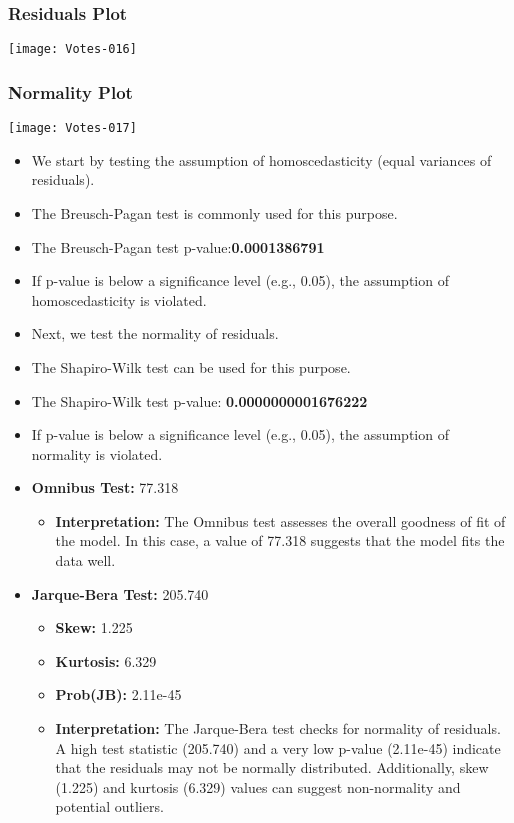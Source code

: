\documentclass[fleqn,a4paper,12pt]{article}
\begin{document}
\subsubsection{Residuals Plot}
\texttt{[image: Votes-016]}

 \subsubsection{Normality Plot}
\texttt{[image: Votes-017]}

 
\begin{itemize}
\item We start by testing the assumption of homoscedasticity (equal variances of residuals).
\item The Breusch-Pagan test is commonly used for this purpose.
\item The Breusch-Pagan test p-value:\textbf{0.0001386791}
\item If p-value is below a significance level (e.g., 0.05), the assumption of homoscedasticity is violated.
\end{itemize}
 
 
\begin{itemize}
\item Next, we test the normality of residuals.
\item The Shapiro-Wilk test can be used for this purpose.
\item The Shapiro-Wilk test p-value: \textbf{0.0000000001676222}
\item If p-value is below a significance level (e.g., 0.05), the assumption of normality is violated.
\end{itemize}
 
 
\begin{itemize}
\item \textbf{Omnibus Test:} 77.318
  \begin{itemize}
  \item \textbf{Interpretation:} The Omnibus test assesses the overall goodness of fit of the model. In this case, a value of 77.318 suggests that the model fits the data well.
  \end{itemize}
    
\item \textbf{Jarque-Bera Test:} 205.740
  \begin{itemize}
  \item \textbf{Skew:} 1.225
  \item \textbf{Kurtosis:} 6.329
  \item \textbf{Prob(JB):} 2.11e-45
  \item \textbf{Interpretation:} The Jarque-Bera test checks for normality of residuals. A high test statistic (205.740) and a very low p-value (2.11e-45) indicate that the residuals may not be normally distributed. Additionally, skew (1.225) and kurtosis (6.329) values can suggest non-normality and potential outliers.
  \end{itemize}
\end{itemize}
 
\end{document}
